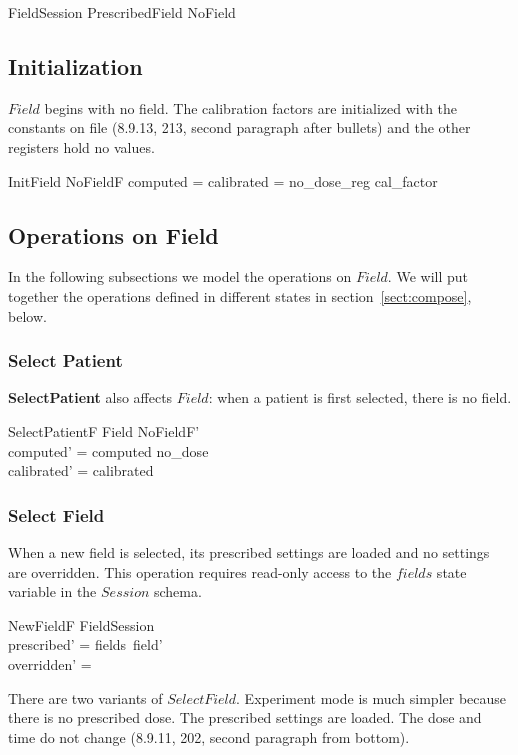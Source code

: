 \documentclass{article}
\begin{document}
\begin{zed}
FieldSession  PrescribedField \lor NoField
\end{zed}

\subsection{Initialization}

$Field$ begins with no field.  The calibration factors
are initialized with the constants on file (8.9.13, 213, second
paragraph after bullets) and the other registers hold no values.

\begin{schema}{InitField}
	NoFieldF
\where
	computed = calibrated = no\_dose\_reg \oplus cal\_factor
\end{schema}

\subsection{Operations on Field}

In the following subsections we model the operations on $Field$.  We
will put together the operations defined in different states in
section~\ref{sect:compose}, below.

\subsubsection{Select Patient}

{\bf SelectPatient} also affects $Field$: when a patient is first selected,
there is no field.


\begin{schema}{SelectPatientF}
	\Delta Field
\where
	NoFieldF' \\
	computed' = computed \oplus no\_dose \\
\also
	calibrated' = calibrated \\
\end{schema}

\subsubsection{Select Field} \label{sect:sel-field-f}

When a new field is selected, its prescribed settings are loaded and
no settings are overridden.  This operation requires read-only access
to the $fields$ state variable in the $Session$ schema.

\begin{schema}{NewFieldF}
	\Delta FieldSession \\
\where
	prescribed' = fields~field' \\
	overridden' = \emptyset \\
\end{schema}
There are two variants of $SelectField$. Experiment mode is much
simpler because there is no prescribed dose.  The prescribed settings
are loaded.  The dose and time do not change (8.9.11, 202, second
paragraph from bottom).
\end{document}

